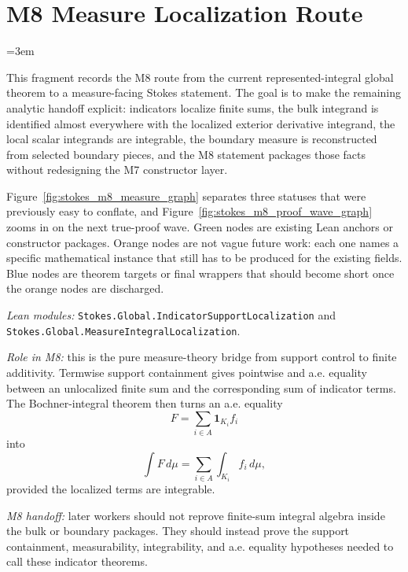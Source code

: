 \section{M8 Measure Localization Route}
\label{sec:m8_measure_localization_route}
\begingroup
\sloppy
\emergencystretch=3em

This fragment records the M8 route from the current represented-integral
global theorem to a measure-facing Stokes statement.  The goal is to make the
remaining analytic handoff explicit: indicators localize finite sums, the bulk
integrand is identified almost everywhere with the localized exterior
derivative integrand, the local scalar integrands are integrable, the boundary
measure is reconstructed from selected boundary pieces, and the M8 statement
packages those facts without redesigning the M7 constructor layer.

\begin{remark}
  \label{anc:m8_graph_conventions}
  Figure~\ref{fig:stokes_m8_measure_graph} separates three statuses that were
  previously easy to conflate, and
  Figure~\ref{fig:stokes_m8_proof_wave_graph} zooms in on the next true-proof
  wave.  Green nodes are existing Lean anchors or constructor packages.  Orange
  nodes are not vague future work: each one names a specific mathematical
  instance that still has to be produced for the existing fields.  Blue nodes
  are theorem targets or final wrappers that should become short once the
  orange nodes are discharged.
\end{remark}

\begin{theorem}
  \label{anc:m8_indicator_theorem}
  \leanok
  \emph{Lean modules:}
  \texttt{Stokes.Global.IndicatorSupportLocalization} and
  \texttt{Stokes.Global.MeasureIntegralLocalization}.

  \emph{Role in M8:}
  this is the pure measure-theory bridge from support control to finite
  additivity.  Termwise support containment gives pointwise and a.e. equality
  between an unlocalized finite sum and the corresponding sum of indicator
  terms.  The Bochner-integral theorem then turns an a.e. equality
  \[
    F = \sum_{i \in A} \mathbf{1}_{K_i} f_i
  \]
  into
  \[
    \int F\,d\mu =
      \sum_{i \in A} \int_{K_i} f_i\,d\mu,
  \]
  provided the localized terms are integrable.

  \emph{M8 handoff:}
  later workers should not reprove finite-sum integral algebra inside the bulk
  or boundary packages.  They should instead prove the support containment,
  measurability, integrability, and a.e. equality hypotheses needed to call
  these indicator theorems.
\end{theorem}

